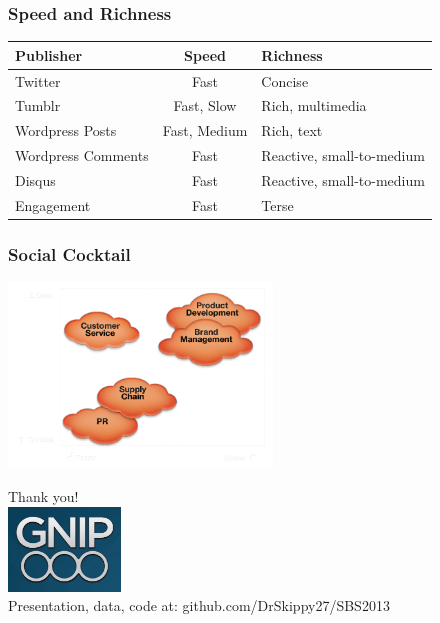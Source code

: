 \documentclass{beamer}
\begin{document}

\begin{frame} \frametitle{Speed and Richness}
\begin{table}
\begin{tabular}{m{2cm}| c |m{3cm}}
\hline
   {Publisher}   &   {Speed} & {Richness} \\
\hline 
    Twitter       & Fast & Concise  \\ [3pt]
    Tumblr       & Fast, Slow & Rich, multimedia\\  [3pt]
    Wordpress Posts & Fast, Medium &  Rich, text\\  [3pt]
    Wordpress Comments  & Fast & Reactive, small-to-medium\\  [3pt]
    Disqus         & Fast & Reactive, small-to-medium\\  [3pt]
    Engagement   & Fast & Terse\\ 
\hline
\end{tabular}
\end{table}
\end{frame}


\begin{frame}\frametitle{Social Cocktail}
  \begin{center}
    \includegraphics[width=7cm]{./imgs/socialcocktailgrid.png}
  \end{center}
\end{frame}



\begin{frame}
  \begin{center}
  \Large{Thank you!  \\ [20pt]}
    \includegraphics[width=3cm]{./imgs/logo.png} \\ [15pt]
   \Large{Presentation, data, code at: github.com/DrSkippy27/SBS2013 }
  \end{center}
\end{frame}
\end{document}
